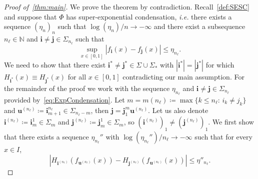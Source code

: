 \documentclass[11pt,]{article}
\def\cref#1{\ref{#1}}%
\theoremstyle{definition}
\theoremstyle{remark}
\renewcommand{\Bbb}[1]{\mathbb{#1}}
\newcommand{\bbN}{{\Bbb N}}         %
\newcommand{\0}{\mathbf{0}}
\newcommand{\bi}{\mathbf{i}}
\newcommand{\bj}{\mathbf{j}}
\newcommand{\bu}{\mathbf{u}}
\begin{document}
\begin{proof}[Proof of~\cref{thm:main}]
We prove the theorem by contradiction. Recall~\cref{def:SESC} and suppose that $\Phi$ has
super-exponential condensation, \emph{i.e.} there exists a sequence $(\eta_n)_n$ such that
$\log(\eta_n)/n\to-\infty$ and there exist a subsequence $n_{\ell}\in\bbN$ and
$\bi\neq\bj\in\Sigma_{n_\ell}$ such that
\begin{equation}\label{eq:ExpCondensation}
  \sup_{x\in[0,1]}|f_{\bi}(x)-f_{\bj}(x)| \leq \eta_{n_\ell}.
\end{equation}
We need to show that there exist $\bi^*\neq\bj^*\in\Sigma\cup\Sigma_*$ with $|\bi^*|=|\bj^*|$ for which $H_{\bi^*}(x)\equiv
H_{\bj^*}(x)$ for all $x\in[0,1]$ contradicting our main assumption. For the remainder of the proof
we work with the sequence $\eta_{n_{\ell}}$ and $\bi\neq\bj\in\Sigma_{n_\ell}$ provided
by~\cref{eq:ExpCondensation}. Let $m=m(n_{\ell})\coloneqq\max\{k\leq n_{\ell}:\, i_k\neq j_k\}$ and
$\bu^{(n_{\ell})}\coloneqq \bi_{m+1}^{n_{\ell}}\in\Sigma_{n_\ell-m}$, then
$\bj=\bj_1^m\bu^{(n_{\ell})}$. Let us also denote $\bi^{(n_{\ell})}\coloneqq\bi_m^1\in\Sigma_m$ and
$\bj^{(n_{\ell})}\coloneqq\bj_m^1\in\Sigma_m$, so $(\bi^{(n_{\ell})})_1\neq (\bj^{(n_{\ell})})_1$.
We first show that there exists a sequence $\eta_{n_{\ell}}''$ with
$\log(\eta_{n_{\ell}}'')/n_{\ell}\to-\infty$ such that for every $x\in I$,
\begin{equation}\label{eq:DiffH_iSUperExp}
|H_{\bi^{(n_\ell)}}(f_{\bu^{(n_\ell)}}(x)) - H_{\bj^{(n_\ell)}}(f_{\bu^{(n_\ell)}}(x))| \leq \eta''_{n_\ell}.
\end{equation}


\end{proof}
\end{document}
